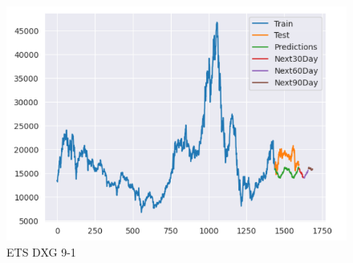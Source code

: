 \documentclass[conference]{IEEEtran}
\begin{document}
\begin{figure}[htbp]
\begin{minipage}{0.23\textwidth}
    \includegraphics[width=1\textwidth]{experiment/ets/TEAM4_ETS_DXG_9_1.png}
    \caption{ETS DXG 9-1}
    \label{fig:nvl_histogram}
    \end{minipage}


\end{figure}
\end{document}
